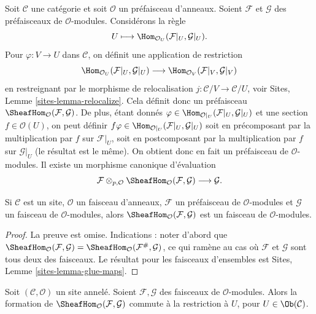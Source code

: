 \noindent
Soit $\mathcal{C}$ une catégorie et soit $\mathcal{O}$ un préfaisceau
d'anneaux. Soient $\mathcal{F}$ et $\mathcal{G}$ des préfaisceaux de
$\mathcal{O}$-modules. Considérons la règle
$$
U \longmapsto \Hom_{\mathcal{O}_U}(\mathcal{F}|_U, \mathcal{G}|_U).
$$
Pour $\varphi : V \to U$ dans $\mathcal{C}$, on définit une application de
restriction
$$
\Hom_{\mathcal{O}_U}(\mathcal{F}|_U, \mathcal{G}|_U)
\longrightarrow
\Hom_{\mathcal{O}_V}(\mathcal{F}|_V, \mathcal{G}|_V)
$$
en restreignant par le morphisme de relocalisation
$j : \mathcal{C}/V \to \mathcal{C}/U$, voir Sites, Lemme
\ref{sites-lemma-relocalize}. Cela définit donc un préfaisceau
$\SheafHom_\mathcal{O}(\mathcal{F}, \mathcal{G})$.
De plus, étant donnés
$\varphi \in \Hom_{\mathcal{O}|_U}(\mathcal{F}|_U, \mathcal{G}|_U)$ et une
section $f \in \mathcal{O}(U)$, on peut définir
$f\varphi \in \Hom_{\mathcal{O}|_U}(\mathcal{F}|_U, \mathcal{G}|_U)$ soit
en précomposant par la multiplication par $f$ sur $\mathcal{F}|_U$, soit en
postcomposant par la multiplication par $f$ sur $\mathcal{G}|_U$ (le résultat
est le même). On obtient donc en fait un préfaisceau de
$\mathcal{O}$-modules. Il existe un morphisme canonique d'évaluation
$$
\mathcal{F}
\otimes_{p, \mathcal{O}}
\SheafHom_\mathcal{O}(\mathcal{F}, \mathcal{G})
\longrightarrow
\mathcal{G}.
$$

\begin{lemma}
\label{lemma-internal-hom}
Si $\mathcal{C}$ est un site, $\mathcal{O}$ un faisceau d'anneaux,
$\mathcal{F}$ un préfaisceau de $\mathcal{O}$-modules et
$\mathcal{G}$ un faisceau de $\mathcal{O}$-modules, alors
$\SheafHom_\mathcal{O}(\mathcal{F}, \mathcal{G})$
est un faisceau de $\mathcal{O}$-modules.
\end{lemma}

\begin{proof}
La preuve est omise. Indications : noter d'abord que
$\SheafHom_\mathcal{O}(\mathcal{F}, \mathcal{G})
= \SheafHom_\mathcal{O}(\mathcal{F}^\#, \mathcal{G})$, ce qui ramène
au cas où $\mathcal{F}$ et $\mathcal{G}$ sont tous deux des
faisceaux. Le résultat pour les faisceaux d'ensembles est Sites, Lemme
\ref{sites-lemma-glue-maps}.
\end{proof}

\begin{lemma}
\label{lemma-internal-hom-restriction}
Soit $(\mathcal{C}, \mathcal{O})$ un site annelé.
Soient $\mathcal{F}, \mathcal{G}$ des faisceaux de $\mathcal{O}$-modules.
Alors la formation de $\SheafHom_\mathcal{O}(\mathcal{F}, \mathcal{G})$
commute à la restriction à $U$, pour $U \in \Ob(\mathcal{C})$.
\end{lemma}


